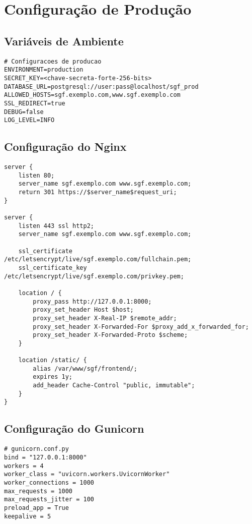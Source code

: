 \documentclass[12pt,a4paper]{article}
\begin{document}
\section{Configuração de Produção}

\subsection{Variáveis de Ambiente}
\begin{lstlisting}
# Configuracoes de producao
ENVIRONMENT=production
SECRET_KEY=<chave-secreta-forte-256-bits>
DATABASE_URL=postgresql://user:pass@localhost/sgf_prod
ALLOWED_HOSTS=sgf.exemplo.com,www.sgf.exemplo.com
SSL_REDIRECT=true
DEBUG=false
LOG_LEVEL=INFO
\end{lstlisting}

\subsection{Configuração do Nginx}
\begin{lstlisting}
server {
    listen 80;
    server_name sgf.exemplo.com www.sgf.exemplo.com;
    return 301 https://$server_name$request_uri;
}

server {
    listen 443 ssl http2;
    server_name sgf.exemplo.com www.sgf.exemplo.com;
    
    ssl_certificate /etc/letsencrypt/live/sgf.exemplo.com/fullchain.pem;
    ssl_certificate_key /etc/letsencrypt/live/sgf.exemplo.com/privkey.pem;
    
    location / {
        proxy_pass http://127.0.0.1:8000;
        proxy_set_header Host $host;
        proxy_set_header X-Real-IP $remote_addr;
        proxy_set_header X-Forwarded-For $proxy_add_x_forwarded_for;
        proxy_set_header X-Forwarded-Proto $scheme;
    }
    
    location /static/ {
        alias /var/www/sgf/frontend/;
        expires 1y;
        add_header Cache-Control "public, immutable";
    }
}
\end{lstlisting}

\subsection{Configuração do Gunicorn}
\begin{lstlisting}
# gunicorn.conf.py
bind = "127.0.0.1:8000"
workers = 4
worker_class = "uvicorn.workers.UvicornWorker"
worker_connections = 1000
max_requests = 1000
max_requests_jitter = 100
preload_app = True
keepalive = 5
\end{lstlisting}
\end{document}
